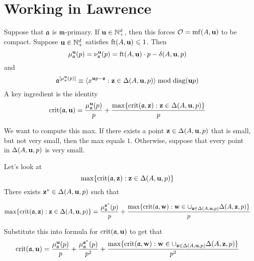 \documentclass[11pt]{amsart}
\begin{document}
\newpage
\section{Working in Lawrence}

Suppose that $\mathfrak{a}$ is $\mathfrak{m}$-primary.  If $\mathbf{u} \in \mathbb{N}^d_+$, then this forces $\mathcal{O} = \operatorname{mf}(A, \mathbf{u})$ to be compact.  Suppose $\mathbf{u} \in \mathbb{N}^d_+$ satisfies $\operatorname{ft}(A, \mathbf{u}) \leqslant 1$.  Then 
%
\[ \mu_{\mathfrak{a}}^{\mathbf{u}}(p) = \nu_{\mathfrak{a}}^{\mathbf{u}}(p) =  \operatorname{ft}(A, \mathbf{u}) \cdot p - \delta(A, \mathbf{u}, p) \] and 
 \[ \mathfrak{a}^{[\mu_{\mathfrak{a}}^{\mathbf{u}}(p) ]} \equiv \langle x^{\mathbf{u}p - \mathbf{z}} : \mathbf{z} \in \Delta(A, \mathbf{u}, p) \rangle \bmod \operatorname{diag}(\mathbf{u}p) \]
%
A key ingredient is the identity 
\[ \operatorname{crit}(\mathfrak{a} ,\mathbf{u}) = \frac{ \mu_{\mathfrak{a}}^{\mathbf{u}}(p)}{p} + \frac{\max \{ \operatorname{crit}(\mathfrak{a}, \mathbf{z}) : \mathbf{z} \in \Delta(A, \mathbf{u}, p) \}}{p} \]

We want to compute this max.  If there exists a point $\mathbf{z} \in \Delta(A, \mathbf{u}, p)$ that is small, but not very small, then the max equals $1$.  Otherwise, suppose that every point in $\Delta(A, \mathbf{u}, p)$ is very small.  

Let's look at 
\[ \max \{ \operatorname{crit}(\mathfrak{a}, \mathbf{z}) : \mathbf{z} \in \Delta(A, \mathbf{u}, p) \} \]
There exists $\mathbf{z}^{\ast} \in \Delta(A, \mathbf{u}, p)$ such that 

\[ \max \{ \operatorname{crit}(\mathfrak{a}, \mathbf{z}) : \mathbf{z} \in \Delta(A, \mathbf{u}, p) \} = \frac{\mu_{\mathfrak{a}}^{\mathbf{z}^{\ast}}(p)}{p} + \frac{\max \{  \operatorname{crit}(\mathfrak{a}, \mathbf{w}) : \mathbf{w} \in \cup_{\mathbf{z} \in \Delta(A, \mathbf{u}, p)} \Delta(A, \mathbf{z}, p)\} }{p} \]

Substitute this into formula for $\operatorname{crit}(\mathfrak{a}, \mathbf{u})$ to get that
%
\[
\operatorname{crit}(\mathfrak{a}, \mathbf{u}) =  \frac{ \mu_{\mathfrak{a}}^{\mathbf{u}}(p)}{p} +  \frac{ \mu_{\mathfrak{a}}^{\mathbf{z}^{\ast}}(p)}{p^2} + \frac{\max \{  \operatorname{crit}(\mathfrak{a}, \mathbf{w}) : \mathbf{w} \in \cup_{\mathbf{z} \in \Delta(A, \mathbf{u}, p)} \Delta(A, \mathbf{z}, p)\} }{p^2}
\]
%

\end{document}
